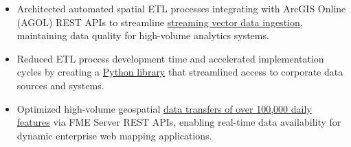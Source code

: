 \documentclass[letterpaper]{article}
\newenvironment{jobtasklist}
        {
            \vspace{-12pt}
            \begin{itemize} \itemsep 0pt
        }{
            \end{itemize}
            \vspace{-3pt}
        }
\newcommand{\impt}[1]{\uline{#1}}
\begin{document}
\begin{jobtasklist}
    \item Architected automated spatial ETL processes integrating with ArcGIS Online (AGOL) REST APIs to streamline
            \impt{streaming vector data ingestion}, maintaining data quality for high-volume analytics systems.
    \item Reduced ETL process development time and accelerated implementation cycles by
            creating a \impt{Python library} that streamlined access to corporate data sources and systems.
    \item Optimized high-volume geospatial \impt{data transfers of over 100,000 daily features}
            via FME Server REST APIs, enabling real-time data availability for
            dynamic enterprise web mapping applications.

\end{jobtasklist}
\end{document}
